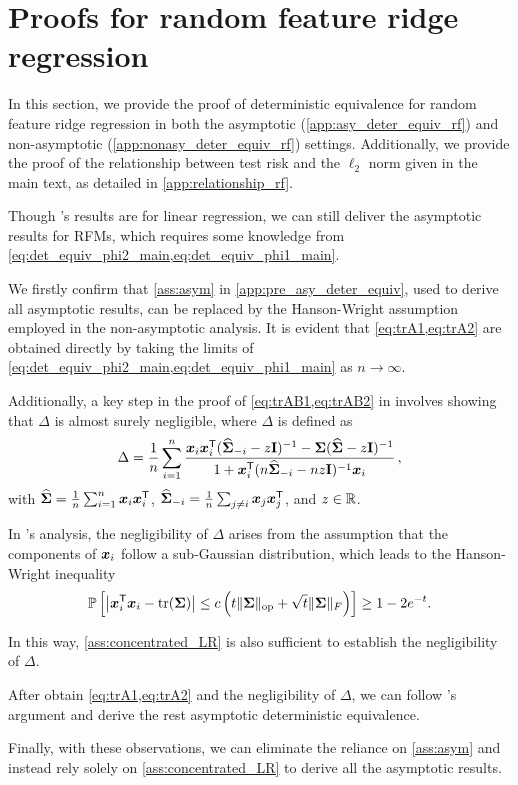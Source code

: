 \section{Proofs for random feature ridge regression}\label{app:proof_rf}

In this section, we provide the proof of deterministic equivalence for random feature ridge regression in both the asymptotic (\cref{app:asy_deter_equiv_rf}) and non-asymptotic (\cref{app:nonasy_deter_equiv_rf}) settings. Additionally, we provide the proof of the relationship between test risk and the $\ell_2$ norm given in the main text, as detailed in \cref{app:relationship_rf}.

Though \citet{bach2024high}'s results are for linear regression, we can still deliver the asymptotic results for RFMs, which requires some knowledge from \cref{eq:det_equiv_phi2_main,eq:det_equiv_phi1_main}.

We firstly confirm that \cref{ass:asym} in \cref{app:pre_asy_deter_equiv}, used to derive all asymptotic results, can be replaced by the Hanson-Wright assumption employed in the non-asymptotic analysis.
It is evident that \cref{eq:trA1,eq:trA2} are obtained directly by taking the limits of \cref{eq:det_equiv_phi2_main,eq:det_equiv_phi1_main} as \(n \to \infty\).

Additionally, a key step in the proof of \cref{eq:trAB1,eq:trAB2} in \citet{bach2024high} involves showing that \(\Delta\) is almost surely negligible, where \(\Delta\) is defined as
\[
\Delta = \frac{1}{n} \sum_{i=1}^{n} \frac{{\boldsymbol x}_i{\boldsymbol x}_i^{\mathsf T}(\widehat{{\boldsymbol \Sigma}}_{-i}-z{\mathbf I})^{-1}-{\boldsymbol \Sigma}(\widehat{{\boldsymbol \Sigma}}-z{\mathbf I})^{-1}}{1 + {\boldsymbol x}_i^{\mathsf T}(n\widehat{{\boldsymbol \Sigma}}_{-i}-nz{\mathbf I})^{-1}{\boldsymbol x}_i}\,,
\]
with \(\widehat{{\boldsymbol \Sigma}} = \frac{1}{n}\sum_{i=1}^{n}{\boldsymbol x}_i{\boldsymbol x}_i^{\mathsf T}\), \(\widehat{{\boldsymbol \Sigma}}_{-i} = \frac{1}{n}\sum_{j\neq i}{\boldsymbol x}_j{\boldsymbol x}_j^{\mathsf T}\), and \(z \in \mathbb{R}\).

In \citet{bach2024high}'s analysis, the negligibility of \(\Delta\) arises from the assumption that the components of \({\boldsymbol x}_i\) follow a sub-Gaussian distribution, which leads to the Hanson-Wright inequality
\[
\mathbb{P} \left[ \left| {\boldsymbol x}_i^{\mathsf T} {\boldsymbol x}_i - \mathrm{tr}({\boldsymbol \Sigma}) \right| \leq c \left( t \|{\boldsymbol \Sigma}\|_{\mathrm{op}} + \sqrt{t} \|{\boldsymbol \Sigma}\|_F \right) \right] \geq 1 - 2e^{-t}.
\]

In this way, \cref{ass:concentrated_LR} is also sufficient to establish the negligibility of \(\Delta\).

After obtain \cref{eq:trA1,eq:trA2} and the negligibility of \(\Delta\), we can follow \citet{bach2024high}'s argument and derive the rest asymptotic deterministic equivalence.

Finally, with these observations, we can eliminate the reliance on \cref{ass:asym} and instead rely solely on \cref{ass:concentrated_LR} to derive all the asymptotic results.








